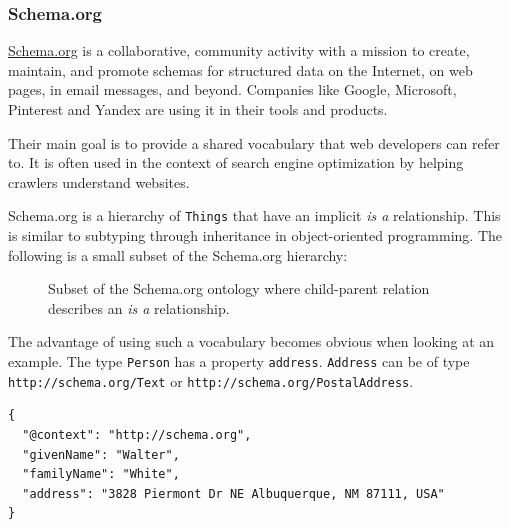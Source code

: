 \subsubsection{Schema.org}
\url{Schema.org} is a collaborative, community activity with a mission to create, maintain, and promote schemas for structured data on the Internet, on web pages, in email messages, and beyond. \citep{welcomeschemaorg} Companies like Google, Microsoft, Pinterest and Yandex are using it in their tools and products.

Their main goal is to provide a shared vocabulary that web developers can refer to. It is often used in the context of search engine optimization by helping crawlers understand websites.

Schema.org is a hierarchy of \lstinline{Things} that have an implicit \textit{is a} relationship. This is similar to subtyping through inheritance in object-oriented programming. The following is a small subset of the Schema.org hierarchy:

\begin{figure}[!htb]
  \caption{\label{fig:schemaorg} Subset of the Schema.org ontology where child-parent relation describes an \textit{is a} relationship.}
\end{figure}

The advantage of using such a vocabulary becomes obvious when looking at an example. The type \lstinline{Person} has a property \lstinline{address}. \lstinline{Address} can be of type \lstinline{http://schema.org/Text} or \lstinline{http://schema.org/PostalAddress}.

\lstset{language=JSON}
\begin{lstlisting}[caption=A person with an address of type Text]
{
  "@context": "http://schema.org",
  "givenName": "Walter",
  "familyName": "White",
  "address": "3828 Piermont Dr NE Albuquerque, NM 87111, USA"
}
\end{lstlisting}

